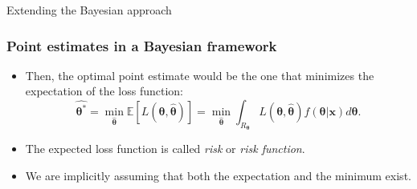 \documentclass[10pt]{beamer}
\theoremstyle{definition}
\begin{document}
\begin{section}{Extending the Bayesian approach}
\begin{frame}[fragile]
\frametitle{Point estimates in a Bayesian framework}
\begin{itemize}\itemsep1em
\item Then, the optimal point estimate would be the one that minimizes the expectation of the loss function: \begin{equation}
\label{ExpLoss}
\boldsymbol{\hat{\theta^*}}=\min_{\boldsymbol{\hat{\theta}}}\mathbb{E}[L(\boldsymbol{\theta},\boldsymbol{\hat{\theta}})]=\min_{\boldsymbol{\hat{\theta}}}\int_{R_{\boldsymbol{\theta}}}
L(\boldsymbol{\theta},\boldsymbol{\hat{\theta}})f(\boldsymbol{\theta}|\mathbf{x})
d\boldsymbol{\theta}.
\end{equation} 
\item The expected loss function is called \emph{risk} or \emph{risk function}.
\item We are implicitly assuming that both the expectation and the minimum exist.
\end{itemize}
\end{frame}


\end{section}
\end{document}
